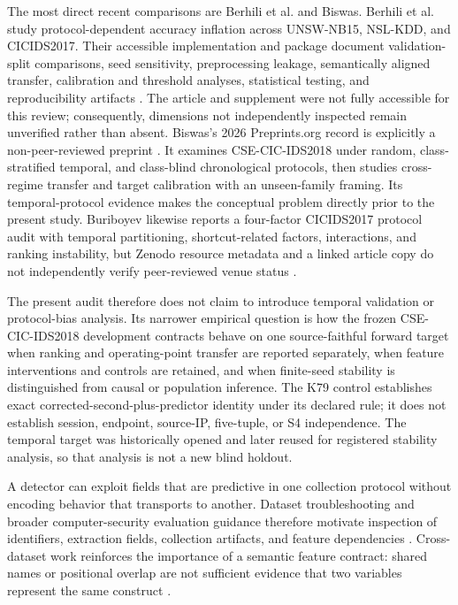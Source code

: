 \documentclass[preprint,12pt]{elsarticle}
\begin{document}
The most direct recent comparisons are Berhili et al. and Biswas. Berhili et al. study protocol-dependent accuracy inflation across UNSW-NB15, NSL-KDD, and CICIDS2017. Their accessible implementation and package document validation-split comparisons, seed sensitivity, preprocessing leakage, semantically aligned transfer, calibration and threshold analyses, statistical testing, and reproducibility artifacts \cite{berhili2026protocol,berhili2026reproducibility}. The article and supplement were not fully accessible for this review; consequently, dimensions not independently inspected remain unverified rather than absent. Biswas's 2026 Preprints.org record is explicitly a non-peer-reviewed preprint \cite{biswas2026drift}. It examines CSE-CIC-IDS2018 under random, class-stratified temporal, and class-blind chronological protocols, then studies cross-regime transfer and target calibration with an unseen-family framing. Its temporal-protocol evidence makes the conceptual problem directly prior to the present study. Buriboyev likewise reports a four-factor CICIDS2017 protocol audit with temporal partitioning, shortcut-related factors, interactions, and ranking instability, but Zenodo resource metadata and a linked article copy do not independently verify peer-reviewed venue status \cite{buriboyev2026protocol}.

The present audit therefore does not claim to introduce temporal validation or protocol-bias analysis. Its narrower empirical question is how the frozen CSE-CIC-IDS2018 development contracts behave on one source-faithful forward target when ranking and operating-point transfer are reported separately, when feature interventions and controls are retained, and when finite-seed stability is distinguished from causal or population inference. The K79 control establishes exact corrected-second-plus-predictor identity under its declared rule; it does not establish session, endpoint, source-IP, five-tuple, or S4 independence. The temporal target was historically opened and later reused for registered stability analysis, so that analysis is not a new blind holdout.

A detector can exploit fields that are predictive in one collection protocol without encoding behavior that transports to another. Dataset troubleshooting and broader computer-security evaluation guidance therefore motivate inspection of identifiers, extraction fields, collection artifacts, and feature dependencies \cite{engelen2021troubleshooting,arp2022dos}. Cross-dataset work reinforces the importance of a semantic feature contract: shared names or positional overlap are not sufficient evidence that two variables represent the same construct \cite{dhooge2020interdataset,layeghy2023crossdomain}.
\end{document}
